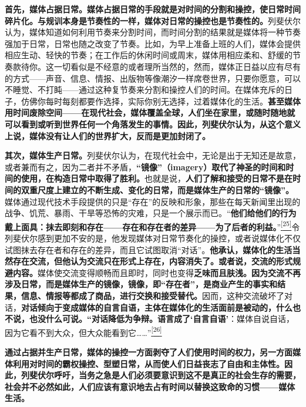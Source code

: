 \documentclass[UTF8, fontset = sourcesans, a4paper, oneside, zihao =
-4, scheme=chinese, no-math, space=true]{ctexbook}
\begin{document}
\textbf{首先，媒体占据日常。媒体占据日常的手段就是对时间的分割和操控，使日常时间碎片化。与规训本身是节奏性的一样，媒体对日常的操控也是节奏性的。}列斐伏尔认为，媒体知道如何利用节奏来分割时间，而时间分割的结果就是媒体将一种节奏强加于日常，日常也随之改变了节奏。比如，为早上准备上班的人们，媒体会提供相应生动、轻快的节奏；在工作后的休闲时间或周末，媒体用相应柔和、舒缓的节奏款待你。这一切看似是不经意的或者理所当然的，然而，媒体正日益以应有尽有的方式------声音、信息、情报、出版物等像潮汐一样席卷世界，只要你愿意，可以不睡觉、不打盹------通过这种复节奏来分割和操控人们的时间。在媒体充斥的日子，仿佛你每时每刻都要作选择，实际你别无选择，过着媒体化的生活。\textbf{甚至媒体用时间废除空间------在现代社会，媒体覆盖全球，人们坐在家里，或随时随地就可以看到或听到世界任何一个角落发生的事情。因此，列斐伏尔认为，从这个意义上说，媒体没有让人们的世界扩大，反而是更加封闭了。}

\textbf{其次，媒体生产日常。}列斐伏尔认为，在现代社会中，无论是出于无知还是故意，或者兼而有之，因为二者并不矛盾，\textbf{``镜像''（imagery）取代了神圣的时间和时间的使用，在构造日常中取得了胜利。}也就是说，\textbf{人们了解和接受的日常不是在时间的双重尺度上建立的不断生成、变化的日常，而是媒体生产的日常的``镜像''。}媒体通过现代技术手段提供的只是``存在''的反映和形象，那些在每天新闻里出现的战争、饥荒、暴雨、干旱等恐怖的灾难，只是一个展示而已。``\textbf{他们给他们的行为戴上面具：抹去即刻和存在------存在和存在者的差异------为了后者的利益。}''\protect\hypertarget{part0009_split_003.htmlux5cux23w25}{}{}\protect\hyperlink{part0009_split_004.htmlux5cux23m25}{\textsuperscript{{[}25{]}}}令列斐伏尔感到更加不安的是，他发现媒体对日常节奏化的操控，或者说媒体化不仅试图抹去存在者和存在的差异，而且它试图取消``对话''。\textbf{他承认，媒体化的生活当然存在交流，但他认为交流只在形式上存在，内容消失了。或者说，交流的形式规避内容。}媒体使交流变得顺畅而且即时，同时也变得\textbf{乏味而且肤浅。因为交流不再涉及日常，而是媒体生产的镜像，镜像，即``存在者''，是商业产生的事实和结果，信息、情报等都成了商品，进行交换和接受替代。}因而，这种交流破坏了对话，\textbf{对话倾向于变成媒体的自言自语，主体在媒体化的生活面前是被动的，什么也不说，也没什么可说。``对话降低为争辩。语言成了`自言自语'}：媒体自说自话，因为它看不到大众，但大众能看到它……''\protect\hypertarget{part0009_split_003.htmlux5cux23w26}{}{}\protect\hyperlink{part0009_split_004.htmlux5cux23m26}{\textsuperscript{{[}26{]}}}

\textbf{通过占据并生产日常，媒体的操控一方面剥夺了人们使用时间的权力，另一方面媒体利用对时间的霸权操控、型塑日常，从而使人们日益丧志了自由和主体性。因此，列斐伏尔呼吁，当务之急是人们必须要意识到这不是真正的社会生存的需要，社会并不必然如此，人们应该有意识地去占有时间以替换这致命的习惯------媒体生活。}
\end{document}
